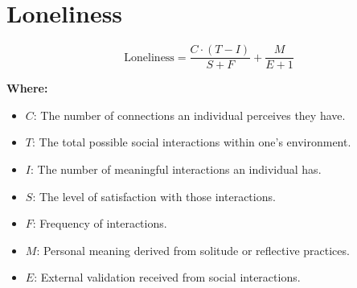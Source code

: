 \chapter{Loneliness}

\begin{equation}
\text{Loneliness} = \frac{C \cdot (T - I)}{S+F} + \frac{M}{E+1}
\end{equation}

\textbf{Where:}

\begin{itemize}
    \item $C$: The number of connections an individual perceives they have.
    \item $T$: The total possible social interactions within one's environment.
    \item $I$: The number of meaningful interactions an individual has.
    \item $S$: The level of satisfaction with those interactions.
    \item $F$: Frequency of interactions.
    \item $M$: Personal meaning derived from solitude or reflective practices.
    \item $E$: External validation received from social interactions.
\end{itemize}